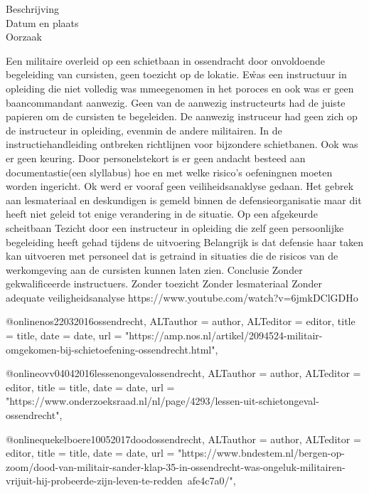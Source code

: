 {{{{{{{{{{{	\begin{description}
	\item[Beschrijving]
	\item[Datum en plaats] 
	\item[Oorzaak]
\end{description}
Een militaire overleid op een schietbaan in ossendracht door onvoldoende begeleiding van cursisten, geen toezicht op de lokatie. E\r was een instructuur in opleiding die niet volledig was mmeegenomen in het poroces en ook was er geen baancommandant aanwezig. Geen van de aanwezig instructeurts had de juiste papieren om de cursisten te begeleiden. De aanwezig instruceur had geen zich op de instructeur in opleiding, evenmin de andere militairen. In de instructiehandleiding ontbreken richtlijnen voor bijzondere schietbanen. Ook was er geen keuring. Door personelstekort is er geen andacht besteed aan documentastie(een slyllabus) hoe en met welke risico’s oefeningnen moeten worden ingericht. Ok werd er vooraf geen veiliheidsanaklyse gedaan. Het gebrek aan lesmateriaal en deskundigen is gemeld binnen de defensieorganisatie maar dit heeft niet geleid tot enige verandering in de situatie.
Op een afgekeurde scheitbaan
Tezicht door een instructeur in opleiding die zelf geen persoonlijke begeleiding heeft gehad tijdens de uitvoering
Belangrijk is dat defensie haar taken kan uitvoeren met personeel dat is getraind in situaties die de risicos van de werkomgeving aan de cursisten kunnen laten zien.
Conclusie
Zonder gekwalificeerde instructuers.
Zonder toezicht
Zonder lesmateriaal
Zonder adequate veiligheidsanalyse
https://www.youtube.com/watch?v=6jmkDClGDHo 
\cite{oVVSchietongevalOssendrecht}



@online{nos22032016ossendrecht,	ALTauthor = {author},	ALTeditor = {editor},	title = {title},	date = {date},	url = {"https://amp.nos.nl/artikel/2094524-militair-omgekomen-bij-schietoefening-ossendrecht.html"},}

@online{ovv04042016lessenongevalossendrecht,	ALTauthor = {author},	ALTeditor = {editor},	title = {title},	date = {date},	url = {"https://www.onderzoeksraad.nl/nl/page/4293/lessen-uit-schietongeval-ossendrecht"},}

@online{quekelboere10052017doodossendrecht,	ALTauthor = {author},	ALTeditor = {editor},	title = {title},	date = {date},	url = {"https://www.bndestem.nl/bergen-op-zoom/dood-van-militair-sander-klap-35-in-ossendrecht-was-ongeluk-militairen-vrijuit-hij-probeerde-zijn-leven-te-redden~afe4c7a0/"},}


}}}}}}}}}}}
